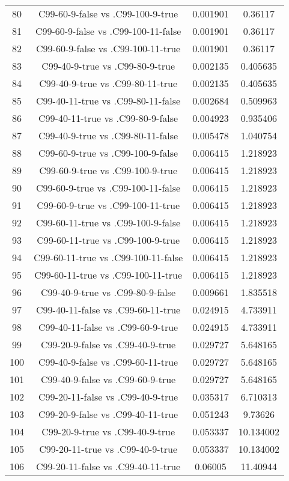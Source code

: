 \documentclass[a4paper,10pt]{article}
\begin{document}
\begin{landscape}
\begin{table}[!htp]
\begin{tabular}{cccc}
80&C99-60-9-false vs .C99-100-9-true&0.001901&0.36117\\
81&C99-60-9-false vs .C99-100-11-false&0.001901&0.36117\\
82&C99-60-9-false vs .C99-100-11-true&0.001901&0.36117\\
83&C99-40-9-true vs .C99-80-9-true&0.002135&0.405635\\
84&C99-40-9-true vs .C99-80-11-true&0.002135&0.405635\\
85&C99-40-11-true vs .C99-80-11-false&0.002684&0.509963\\
86&C99-40-11-true vs .C99-80-9-false&0.004923&0.935406\\
87&C99-40-9-true vs .C99-80-11-false&0.005478&1.040754\\
88&C99-60-9-true vs .C99-100-9-false&0.006415&1.218923\\
89&C99-60-9-true vs .C99-100-9-true&0.006415&1.218923\\
90&C99-60-9-true vs .C99-100-11-false&0.006415&1.218923\\
91&C99-60-9-true vs .C99-100-11-true&0.006415&1.218923\\
92&C99-60-11-true vs .C99-100-9-false&0.006415&1.218923\\
93&C99-60-11-true vs .C99-100-9-true&0.006415&1.218923\\
94&C99-60-11-true vs .C99-100-11-false&0.006415&1.218923\\
95&C99-60-11-true vs .C99-100-11-true&0.006415&1.218923\\
96&C99-40-9-true vs .C99-80-9-false&0.009661&1.835518\\
97&C99-40-11-false vs .C99-60-11-true&0.024915&4.733911\\
98&C99-40-11-false vs .C99-60-9-true&0.024915&4.733911\\
99&C99-20-9-false vs .C99-40-9-true&0.029727&5.648165\\
100&C99-40-9-false vs .C99-60-11-true&0.029727&5.648165\\
101&C99-40-9-false vs .C99-60-9-true&0.029727&5.648165\\
102&C99-20-11-false vs .C99-40-9-true&0.035317&6.710313\\
103&C99-20-9-false vs .C99-40-11-true&0.051243&9.73626\\
104&C99-20-9-true vs .C99-40-9-true&0.053337&10.134002\\
105&C99-20-11-true vs .C99-40-9-true&0.053337&10.134002\\
106&C99-20-11-false vs .C99-40-11-true&0.06005&11.40944\\

\end{tabular}
\end{table}
\end{landscape}
\end{document}
